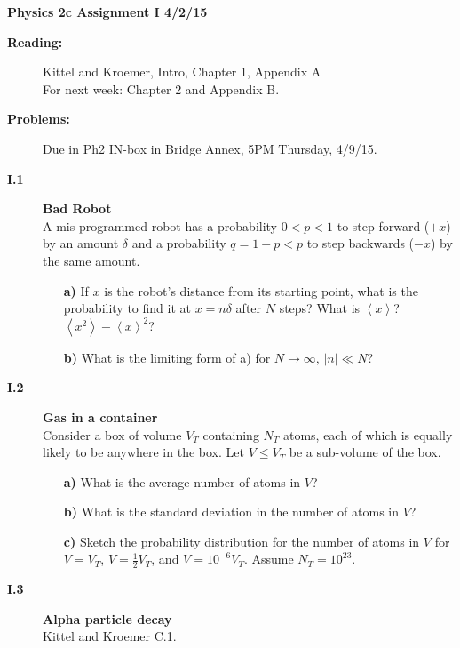 \documentclass[11pt]{article}
\def\vev#1{\left\langle #1\right\rangle}
\begin{document}
%
\centerline{\large\bf Physics 2c \hfill Assignment I \hfill  4/2/15}

\medskip
\begin{description}
\item[{\bf Reading:} ] Kittel and Kroemer, Intro, Chapter 1, Appendix A \\
                       For next week: Chapter 2 and Appendix B.
\item[{\bf Problems:} \hfill ] Due in Ph2 IN-box in Bridge Annex, 5PM  Thursday, 4/9/15.
\end{description}


\medskip

\begin{description}

\item[{\bf I.1} ]
{\bf Bad Robot} \\
A mis-programmed robot has a probability $0<p<1$ to step forward ($+x$)
by an amount $\delta$ and a probability $q=1-p<p$ to step backwards ($-x$)
by the same amount.
\begin{itemize}
\item[\bf a)] If $x$ is the robot's distance
from its starting point, what is the probability to find it
at $x=n\delta$ after $N$ steps?
What is $\vev{x}$?
$\vev{x^2}-\vev{x}^2$?
\item[\bf b)] What is the limiting form of a)
for $N\rightarrow\infty, \, |n|\ll N$?
\end{itemize}

\item[{\bf I.2} ]
{\bf Gas in a container} \\
Consider a box of volume $V_T$ containing $N_T$ atoms,
each of which is equally likely to be anywhere in the box.
Let $V\le V_T$ be a sub-volume of the box.
\begin{itemize}
\item[\bf a)] What is the average number of atoms in $V$?
\item[\bf b)] What is the standard deviation in the number of atoms in $V$?
\item[\bf c)] Sketch the probability distribution
              for the number of atoms in $V$
              for $V=V_T$, $V=\frac{1}{2}V_T$, and $V = 10^{-6}V_T$.
              Assume $N_T = 10^{23}$.
\end{itemize}


\item[{\bf I.3} ] 
{\bf Alpha particle decay} \\
Kittel and Kroemer C.1.


\end{description}
\end{document}
